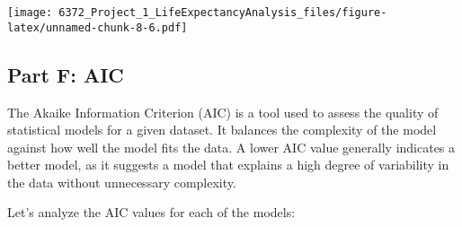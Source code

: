 \documentclass[
]{article}
\begin{document}
\texttt{[image: 6372\_Project\_1\_LifeExpectancyAnalysis\_files/figure-latex/unnamed-chunk-8-6.pdf]}

\hypertarget{part-f-aic}{%
\subsection{Part F: AIC}\label{part-f-aic}}

The Akaike Information Criterion (AIC) is a tool used to assess the
quality of statistical models for a given dataset. It balances the
complexity of the model against how well the model fits the data. A
lower AIC value generally indicates a better model, as it suggests a
model that explains a high degree of variability in the data without
unnecessary complexity.

Let's analyze the AIC values for each of the models:
\end{document}
